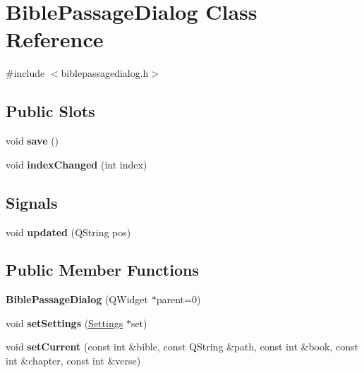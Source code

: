 \hypertarget{classBiblePassageDialog}{
\section{BiblePassageDialog Class Reference}
\label{classBiblePassageDialog}
}


{\ttfamily \#include $<$biblepassagedialog.h$>$}

\subsection*{Public Slots}
\begin{DoxyCompactItemize}
\item 
\hypertarget{classBiblePassageDialog_a8a9b3d5faed1129b3b976dccc3f291dc}{
void {\bfseries save} ()}
\label{classBiblePassageDialog_a8a9b3d5faed1129b3b976dccc3f291dc}

\item 
\hypertarget{classBiblePassageDialog_a6a0743c2014edfb1a01d7973c38b4704}{
void {\bfseries indexChanged} (int index)}
\label{classBiblePassageDialog_a6a0743c2014edfb1a01d7973c38b4704}

\end{DoxyCompactItemize}
\subsection*{Signals}
\begin{DoxyCompactItemize}
\item 
\hypertarget{classBiblePassageDialog_acbbdf41e16d8d457b9ed3dab37e7b2ea}{
void {\bfseries updated} (QString pos)}
\label{classBiblePassageDialog_acbbdf41e16d8d457b9ed3dab37e7b2ea}

\end{DoxyCompactItemize}
\subsection*{Public Member Functions}
\begin{DoxyCompactItemize}
\item 
\hypertarget{classBiblePassageDialog_a987ec648297e190ef0d8f9f3bf064430}{
{\bfseries BiblePassageDialog} (QWidget $\ast$parent=0)}
\label{classBiblePassageDialog_a987ec648297e190ef0d8f9f3bf064430}

\item 
\hypertarget{classBiblePassageDialog_a7ad654b6149f0b3ce57ca2019873a3fb}{
void {\bfseries setSettings} (\hyperlink{classSettings}{Settings} $\ast$set)}
\label{classBiblePassageDialog_a7ad654b6149f0b3ce57ca2019873a3fb}

\item 
\hypertarget{classBiblePassageDialog_ae571d538543805777f69954f2d29308e}{
void {\bfseries setCurrent} (const int \&bible, const QString \&path, const int \&book, const int \&chapter, const int \&verse)}
\label{classBiblePassageDialog_ae571d538543805777f69954f2d29308e}

\end{DoxyCompactItemize}
